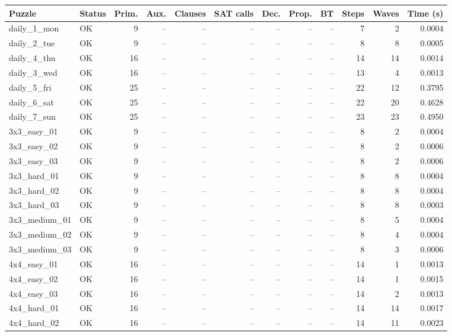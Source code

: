 \begin{tabular}{l l r r r r r r r r r r }
\hline
Puzzle & Status & Prim. & Aux. & Clauses & SAT calls & Dec. & Prop. & BT & Steps & Waves & Time (s) \\
\hline
daily\_1\_mon & OK & 9 & -- & -- & -- & -- & -- & -- & 7 & 2 & 0.0004 \\
daily\_2\_tue & OK & 9 & -- & -- & -- & -- & -- & -- & 8 & 8 & 0.0005 \\
daily\_4\_thu & OK & 16 & -- & -- & -- & -- & -- & -- & 14 & 14 & 0.0014 \\
daily\_3\_wed & OK & 16 & -- & -- & -- & -- & -- & -- & 13 & 4 & 0.0013 \\
daily\_5\_fri & OK & 25 & -- & -- & -- & -- & -- & -- & 22 & 12 & 0.3795 \\
daily\_6\_sat & OK & 25 & -- & -- & -- & -- & -- & -- & 22 & 20 & 0.4628 \\
daily\_7\_sun & OK & 25 & -- & -- & -- & -- & -- & -- & 23 & 23 & 0.4950 \\
3x3\_easy\_01 & OK & 9 & -- & -- & -- & -- & -- & -- & 8 & 2 & 0.0004 \\
3x3\_easy\_02 & OK & 9 & -- & -- & -- & -- & -- & -- & 8 & 2 & 0.0006 \\
3x3\_easy\_03 & OK & 9 & -- & -- & -- & -- & -- & -- & 8 & 2 & 0.0006 \\
3x3\_hard\_01 & OK & 9 & -- & -- & -- & -- & -- & -- & 8 & 8 & 0.0004 \\
3x3\_hard\_02 & OK & 9 & -- & -- & -- & -- & -- & -- & 8 & 8 & 0.0004 \\
3x3\_hard\_03 & OK & 9 & -- & -- & -- & -- & -- & -- & 8 & 8 & 0.0003 \\
3x3\_medium\_01 & OK & 9 & -- & -- & -- & -- & -- & -- & 8 & 5 & 0.0004 \\
3x3\_medium\_02 & OK & 9 & -- & -- & -- & -- & -- & -- & 8 & 4 & 0.0004 \\
3x3\_medium\_03 & OK & 9 & -- & -- & -- & -- & -- & -- & 8 & 3 & 0.0006 \\
4x4\_easy\_01 & OK & 16 & -- & -- & -- & -- & -- & -- & 14 & 1 & 0.0013 \\
4x4\_easy\_02 & OK & 16 & -- & -- & -- & -- & -- & -- & 14 & 1 & 0.0015 \\
4x4\_easy\_03 & OK & 16 & -- & -- & -- & -- & -- & -- & 14 & 2 & 0.0013 \\
4x4\_hard\_01 & OK & 16 & -- & -- & -- & -- & -- & -- & 14 & 14 & 0.0017 \\
4x4\_hard\_02 & OK & 16 & -- & -- & -- & -- & -- & -- & 14 & 11 & 0.0023 \\

\end{tabular}

